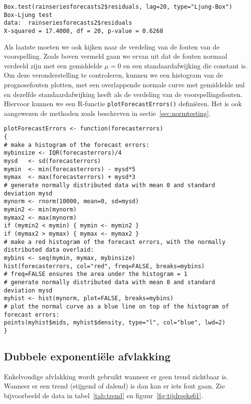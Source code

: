 
\begin{lstlisting}
Box.test(rainseriesforecasts2$residuals, lag=20, type="Ljung-Box")
Box-Ljung test
data:  rainseriesforecasts2$residuals
X-squared = 17.4008, df = 20, p-value = 0.6268
\end{lstlisting}

Als laatste moeten we ook kijken naar de verdeling van de fouten van de voorspelling. Zoals boven vermeld gaan we ervan uit dat de fouten normaal verdeeld zijn met een gemiddelde $\mu = 0$ en een standaardafwijking die constant is. Om deze veronderstelling te controleren, kunnen we een histogram van de prognosefouten plotten, met een overlappende normale curve met gemiddelde nul en dezelfde standaardafwijking heeft als de verdeling van de voorspellingsfouten. Hiervoor kunnen we een R-functie \texttt{plotForecastErrors()} definiëren. Het is ook aangewezen de methoden zoals beschreven in sectie~\ref{sec:normtesting}.


\begin{lstlisting}
plotForecastErrors <- function(forecasterrors)
{
# make a histogram of the forecast errors:
mybinsize <- IQR(forecasterrors)/4
mysd   <- sd(forecasterrors)
mymin  <- min(forecasterrors) - mysd*5
mymax  <- max(forecasterrors) + mysd*3
# generate normally distributed data with mean 0 and standard deviation mysd
mynorm <- rnorm(10000, mean=0, sd=mysd)
mymin2 <- min(mynorm)
mymax2 <- max(mynorm)
if (mymin2 < mymin) { mymin <- mymin2 }
if (mymax2 > mymax) { mymax <- mymax2 }
# make a red histogram of the forecast errors, with the normally distributed data overlaid:
mybins <- seq(mymin, mymax, mybinsize)
hist(forecasterrors, col="red", freq=FALSE, breaks=mybins)
# freq=FALSE ensures the area under the histogram = 1
# generate normally distributed data with mean 0 and standard deviation mysd
myhist <- hist(mynorm, plot=FALSE, breaks=mybins)
# plot the normal curve as a blue line on top of the histogram of forecast errors:
points(myhist$mids, myhist$density, type="l", col="blue", lwd=2)
}
\end{lstlisting}

\subsection{Dubbele exponentiële afvlakking}

Enkelvoudige afvlakking wordt gebruikt wanneer er geen trend zichtbaar is. Wanneer er een trend (stijgend of dalend) is dan kan er iets fout gaan. Zie bijvoorbeeld de data in tabel~\ref{tab:trend} en figuur~\ref{fig:tijdreeks61}.

